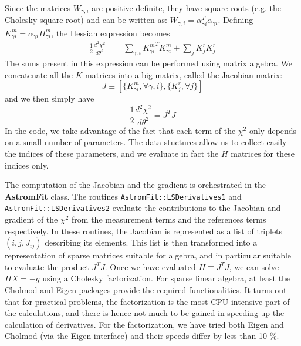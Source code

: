 \documentclass[a4paper,12pt]{scrartcl}
\newcommand{\ClName}[1]{{\bf #1}}
\newcommand{\RoutineName}[1]{\texttt{#1}}
\def\bf{\normalfont\bfseries}
\begin{document}
Since the matrices $W_{\gamma,i}$ are positive-definite, they have
square roots (e.g. the Cholesky square root) and can be written as:
$W_{\gamma,i} = \alpha^T_{\gamma i} \alpha_{\gamma i}$. Defining
$K^m_{\gamma i} = \alpha_{\gamma i} H^m_{\gamma i}$, the Hessian
expression becomes
\begin{align}
\frac{1}{2} \frac{d^2 \chi^2}{d \theta^2} & =  \sum_{\gamma,i}  {K^m_{\gamma i}}^T K^m_{\gamma i} +\sum_j {K^r_{j}} K^r_{j} %
\end{align}
The sums present in this expression can be performed using
matrix algebra. We concatenate all the $K$ matrices into a big
matrix, called the Jacobian matrix:
$$
J \equiv \left[\{K^m_{\gamma i}, \forall \gamma, i\}, \{ K^r_{j}, \forall j\} \right]
$$
and we then simply have
$$
\frac{1}{2} \frac{d^2 \chi^2}{d \theta^2} = J^T J
$$
In the code, we take advantage of the fact that each term of the
$\chi^2$ only depends on a small number of parameters. The data
stuctures allow us to collect easily the indices of these parameters,
and we evaluate in fact the $H$ matrices for these indices only.

The computation of the Jacobian and the gradient is orchestrated in
the \ClName{AstromFit} class.  The routines
\RoutineName{AstromFit::LSDerivatives1} and
\RoutineName{AstromFit::LSDerivatives2} evaluate the contributions to
the Jacobian and gradient of the $\chi^2$ from the measurement terms
and the references terms respectively. In these routines, the Jacobian
is represented as a list of triplets $(i,j,J_{ij})$ describing its
elements. This list is then transformed into a representation of
sparse matrices suitable for algebra, and in particular suitable to
evaluate the product $J^TJ$. Once we have evaluated $H\equiv J^TJ$, we
can solve $HX=-g$ using a Cholesky factorization. For sparse linear
algebra, at least the Cholmod and Eigen packages provide the required
functionalities. It turns out that for practical problems, the
factorization is the most CPU intensive part of the calculations, and
there is hence not much to be gained in speeding up the calculation of
derivatives. For the factorization, we have tried both Eigen and
Cholmod (via the Eigen interface) and their speeds differ by less
than 10 \%. 


\end{document}
